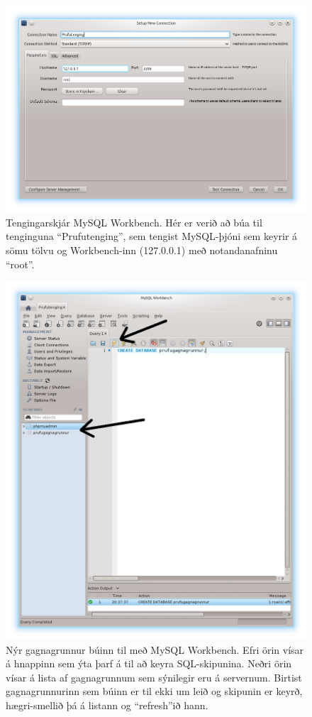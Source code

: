 \begin{figure}
\caption[Tengingarskjár MySQL Workbench]{Tengingarskjár MySQL Workbench. Hér er verið að búa til tenginguna ``Prufutenging'', sem tengist MySQL-þjóni sem keyrir á sömu tölvu og Workbench-inn (127.0.0.1) með notandanafninu ``root''.}
\label{mynd:workbench-login}
\centering
\includegraphics[width=\linewidth]{myndir/workbench-login}
\end{figure}

\begin{figure}
\caption[Nýr gagnagrunnur]{Nýr gagnagrunnur búinn til með MySQL Workbench. Efri örin vísar á hnappinn sem ýta þarf á til að keyra SQL-skipunina. Neðri örin vísar á lista af gagnagrunnum sem sýnilegir eru á servernum. Birtist gagnagrunnurinn sem búinn er til ekki um leið og skipunin er keyrð, hægri-smellið þá á listann og ``refresh''ið hann.}
\label{mynd:workbench-create-db}
\centering
\includegraphics[width=0.8\linewidth]{myndir/workbench-create-db-or}
\end{figure}

